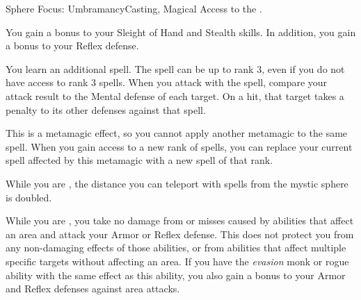   \begin{magicalfeat}{Sphere Focus: Umbramancy}{Casting, Magical}
    \featpre Access to the  .

     You gain a  bonus to your Sleight of Hand and Stealth skills.
    In addition, you gain a  bonus to your Reflex defense.

     You learn an additional spell.
    The spell can be up to rank 3, even if you do not have access to rank 3 spells.
    When you attack with the spell, compare your attack result to the Mental defense of each  target.
    On a hit, that target takes a  penalty to its other defenses against that spell.

    This is a metamagic effect, so you cannot apply another metamagic to the same spell.
    When you gain access to a new rank of spells, you can replace your current spell affected by this metamagic with a new spell of that rank.

     While you are , the distance you can teleport with spells from the  mystic sphere is doubled.

     While you are , you take no damage from  or misses caused by abilities that affect an area and attack your Armor or Reflex defense.
    This does not protect you from any non-damaging effects of those abilities, or from abilities that affect multiple specific targets without affecting an area.
    If you have the \textit{evasion} monk or rogue ability with the same effect as this ability, you also gain a  bonus to your Armor and Reflex defenses against area attacks.
  \end{magicalfeat}

